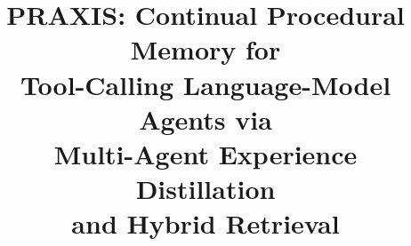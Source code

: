\documentclass[conference]{IEEEtran}
\begin{document}
\title{PRAXIS: Continual Procedural Memory for\\
Tool-Calling Language-Model Agents via\\
Multi-Agent Experience Distillation\\
and Hybrid Retrieval}

\author{
}

\maketitle
\end{document}
